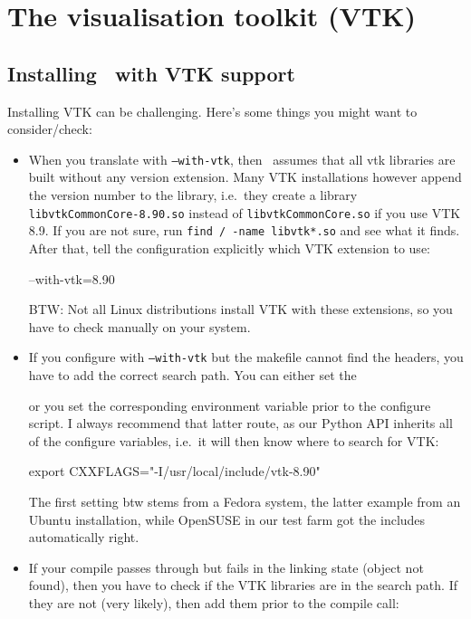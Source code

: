 \chapter{The visualisation toolkit (VTK)}
\label{chapter:vtk}

\section{Installing \Peano\ with VTK support}
Installing VTK can be challenging. 
Here's some things you might want to consider/check:

\begin{itemize}
  \item When you translate with \texttt{--with-vtk}, then \Peano\ assumes that
  all vtk libraries are built without any version extension. Many VTK
  installations however append the version number to the library, i.e.~they
  create a library \texttt{libvtkCommonCore-8.90.so} instead of
  \texttt{libvtkCommonCore.so} if you use VTK 8.9. If you are not sure, run
  \texttt{find / -name libvtk*.so} and see what it finds. After that, tell the
  configuration explicitly which VTK extension to use:
  \begin{code}
--with-vtk=8.90
  \end{code}
  BTW: Not all Linux distributions install VTK with these extensions, so you
  have to check manually on your system.
  \item If you configure with \texttt{--with-vtk} but the makefile cannot find
  the headers, you have to add the correct search path. You can either set the 
  or you set the corresponding environment variable prior to the configure
  script. I always recommend that latter route, as our Python API inherits all
  of the configure variables, i.e.~it will then know where to search for VTK:
\begin{code}
export CXXFLAGS="-I/usr/local/include/vtk-8.90"
\end{code}
  The first setting btw stems from a Fedora system, the latter example from an
  Ubuntu installation, while OpenSUSE in our test farm got the includes
  automatically right.
  \item If your compile passes through but fails in the linking state (object
  not found), then you have to check if the VTK libraries are in the search
  path. If they are not (very likely), then add them prior to the compile call:

\end{itemize}
